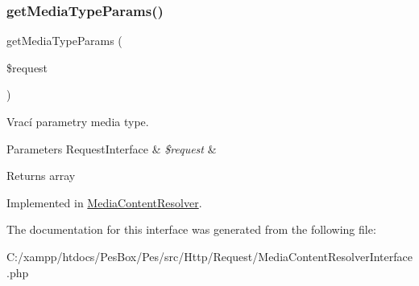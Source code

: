 \subsubsection{\texorpdfstring{get\+Media\+Type\+Params()}{getMediaTypeParams()}}
{\footnotesize\ttfamily get\+Media\+Type\+Params (\begin{DoxyParamCaption}\item[{Server\+Request\+Interface}]{\$request }\end{DoxyParamCaption})}

Vrací parametry media type.


\begin{DoxyParams}[1]{Parameters}
Request\+Interface & {\em \$request} & \\
\hline
\end{DoxyParams}
\begin{DoxyReturn}{Returns}
array 
\end{DoxyReturn}


Implemented in \mbox{\hyperlink{class_pes_1_1_http_1_1_request_1_1_media_content_resolver_af1d02209d81e589acebb7d0afecbe6da}{Media\+Content\+Resolver}}.



The documentation for this interface was generated from the following file\+:\begin{DoxyCompactItemize}
\item 
C\+:/xampp/htdocs/\+Pes\+Box/\+Pes/src/\+Http/\+Request/Media\+Content\+Resolver\+Interface.\+php\end{DoxyCompactItemize}
